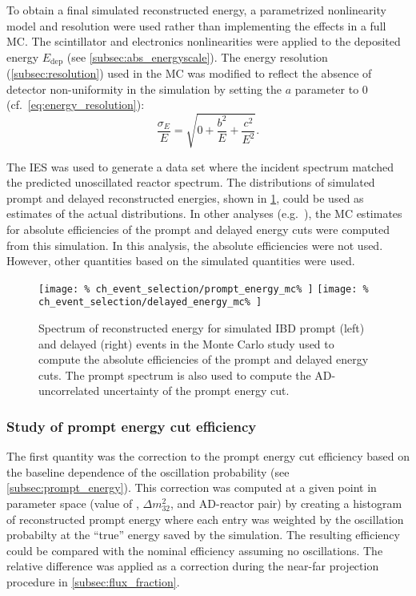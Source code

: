To obtain a final simulated reconstructed energy,
a parametrized nonlinearity model and resolution were used
rather than implementing the effects in a full MC.
The scintillator and electronics nonlinearities were applied
to the deposited energy $E_{\text{dep}}$
(see \cref{subsec:abs_energyscale}).
The energy resolution (\cref{subsec:resolution}) used in the MC
was modified to reflect
the absence of detector non-uniformity in the simulation
by setting the $a$ parameter to 0 (cf.\ \cref{eq:energy_resolution}):
\begin{equation}
    \frac{\sigma_E}{E} = \sqrt{0 + \frac{b^2}{E} + \frac{c^2}{E^2}}.
\end{equation}

The IES was used to generate a data set
where the incident \nuebar{} spectrum
matched the predicted unoscillated reactor \nuebar{} spectrum.
The distributions of simulated prompt and delayed reconstructed energies,
shown in \cref{fig:prompt_eff_mc},
could be used as estimates of the actual distributions.
In other analyses (e.g.\ \cite{nh2016}), the MC estimates
for absolute efficiencies of the prompt and delayed energy cuts
were computed from this simulation.
In this analysis, the absolute efficiencies were not used.
However, other quantities based on the simulated quantities
were used.

\begin{figure}
    \centering
    \texttt{[image: \%
        ch\_event\_selection/prompt\_energy\_mc\%
    ]}
    \texttt{[image: \%
        ch\_event\_selection/delayed\_energy\_mc\%
    ]}
    \caption[Simulated prompt and delayed spectra]{Spectrum of reconstructed energy for simulated IBD prompt (left)
        and delayed (right) events
        in the Monte Carlo study used to compute the absolute efficiencies
        of the prompt and delayed energy cuts.
        The prompt spectrum is also used to compute the
        AD-uncorrelated uncertainty of the prompt energy cut.
    }
    \label{fig:prompt_eff_mc}
\end{figure}

\subsubsection{Study of prompt energy cut efficiency}

The first quantity was the correction to the prompt energy cut efficiency
based on the baseline dependence of the oscillation probability
(see \cref{subsec:prompt_energy}).
This correction was computed at a given point in parameter space
(value of \thetaot{}, $\Delta m^2_{32}$, and AD-reactor pair)
by creating a histogram of reconstructed prompt energy
where each entry was weighted by the oscillation probabilty
at the ``true'' \nuebar{} energy saved by the simulation.
The resulting efficiency could be compared
with the nominal efficiency assuming no oscillations.
The relative difference was applied as a correction
during the near-far projection procedure in \cref{subsec:flux_fraction}.

